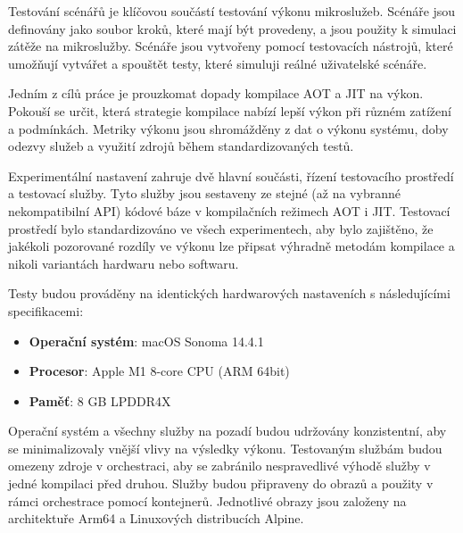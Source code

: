 


Testování scénářů je klíčovou součástí testování výkonu mikroslužeb. Scénáře jsou definovány jako soubor kroků, které mají být provedeny, a jsou použity k simulaci zátěže na mikroslužby. Scénáře jsou vytvořeny pomocí testovacích nástrojů, které umožňují vytvářet a spouštět testy, které simuluji reálné uživatelské scénáře.


Jedním z cílů práce je prouzkomat dopady kompilace AOT a JIT na výkon. Pokouší se určit, která strategie kompilace nabízí lepší výkon při různém zatížení a podmínkách. Metriky výkonu jsou shromážděny z dat o výkonu systému, doby odezvy služeb a využití zdrojů během standardizovaných testů.

Experimentální nastavení zahruje dvě hlavní součásti, řízení testovacího prostředí a testovací služby. Tyto služby jsou sestaveny ze stejné (až na vybranné nekompatibilní API) kódové báze v kompilačních režimech AOT i JIT. Testovací prostředí bylo standardizováno ve všech experimentech, aby bylo zajištěno, že jakékoli pozorované rozdíly ve výkonu lze připsat výhradně metodám kompilace a nikoli variantách hardwaru nebo softwaru.

Testy budou prováděny na identických hardwarových nastaveních s následujícími specifikacemi:

\begin{itemize}
    \item \textbf{Operační systém}: macOS Sonoma 14.4.1
    \item \textbf{Procesor}: Apple M1 8-core CPU (ARM 64bit)
    \item \textbf{Paměť}: 8 GB LPDDR4X
\end{itemize}

Operační systém a všechny služby na pozadí budou udržovány konzistentní, aby se minimalizovaly vnější vlivy na výsledky výkonu. Testovaným službám budou omezeny zdroje v orchestraci, aby se zabránilo nespravedlivé výhodě služby v jedné kompilaci před druhou. Služby budou připraveny do obrazů a použity v rámci orchestrace pomocí kontejnerů. Jednotlivé obrazy jsou založeny na architektuře Arm64 a Linuxových distribucích Alpine.


